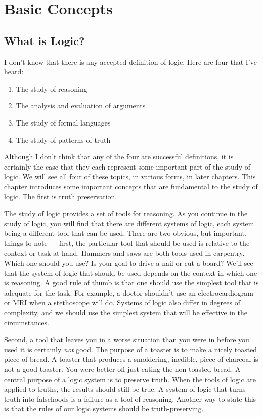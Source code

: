 \documentclass[../logic-text.tex]{subfiles}
\begin{document}
\chapter{Basic Concepts}
\label{chap:intro}

\section{What is Logic?}
\label{sec:what-logic}

I don't know that there is any accepted definition of logic. Here are four that I've heard:

\begin{enumerate}
\item The study of reasoning
\item The analysis and evaluation of arguments
\item The study of formal languages
\item The study of patterns of truth
\end{enumerate}

Although I don't think that any of the four are successful definitions, it is certainly the case that they each represent some important part of the study of logic.
We will see all four of these topics, in various forms, in later chapters.
This chapter introduces some important concepts that are fundamental to the study of logic.
The first is truth preservation.

The study of logic provides a set of tools for reasoning.
As you continue in the study of logic, you will find that there are different systems of logic, each system being a different tool that can be used.
There are two obvious, but important, things to note --- first, the particular tool that should be used is relative to the context or task at hand.
Hammers and saws are both tools used in carpentry.
Which one should you use?
Is your goal to drive a nail or cut a board?
We'll see that the system of logic that should be used depends on the context in which one is reasoning.
A good rule of thumb is that one should use the simplest tool that is adequate for the task.
For example, a doctor shouldn't use an electrocardiogram or MRI when a stethoscope will do.
Systems of logic also differ in degrees of complexity, and we should use the simplest system that will be effective in the circumstances.

Second, a tool that leaves you in a worse situation than you were in before you used it is certainly \emph{not} good.
The purpose of a toaster is to make a nicely toasted piece of bread.
A toaster that produces a smoldering, inedible, piece of charcoal is not a good toaster.
You were better off just eating the non-toasted bread.
A central purpose of a logic system is to preserve truth.
When the tools of logic are applied to truths, the results should still be true.
A system of logic that turns truth into falsehoods is a failure as a tool of reasoning.
Another way to state this is that the rules of our logic systems should be truth-preserving.
\end{document}

